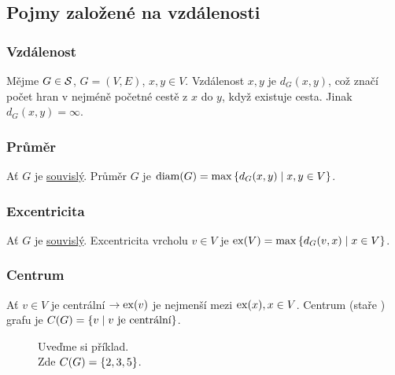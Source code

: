 \subsection{Pojmy založené na vzdálenosti}
\subsubsection{Vzdálenost}
Mějme $G \in \S$, $G = (V,E)$, $x, y \in V$.
Vzdálenost $x,y$ je $d_G(x,y)$, což značí počet hran v nejméně početné cestě z $x$ do $y$, když existuje cesta. Jinak
$d_G(x,y) = \infty$.

\subsubsection{Průměr}
Ať $G$ je \hyperref[souvisly]{souvislý}. Průměr $G$ je $\diam(G) = \max\bc{d_G(x,y) \mid x, y \in V}$.

\subsubsection{Excentricita}
Ať $G$ je \hyperref[souvisly]{souvislý}. Excentricita vrcholu $v \in V$ je $\ex(V) = \max\bc{d_G(v,x) \mid x \in V}$.

\subsubsection{Centrum}
Ať $v \in V$ je centrální $\rightarrow \ex(v)$ je nejmenší mezi $\ex(x), x\in V$. Centrum (staře ) grafu je
$C(G) = \bc{v \mid v \text{ je centrální}}$.
\begin{figure}[H]
    \centering
    \begin{minipage}[c]{0.3\textwidth}
        Uveďme si příklad. \\ Zde $C(G) = \bc{2,3,5}$.
    \end{minipage}%
    \hspace{0.05\textwidth}
    \begin{minipage}[c]{0.6\textwidth}
        \begin{figure}[H]
        \end{figure}
    \end{minipage}
\end{figure}

